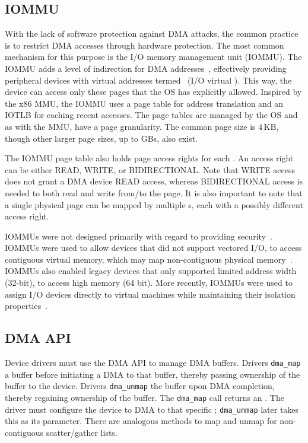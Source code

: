 \subsection{IOMMU}

With the lack of software protection against DMA attacks, the common practice is to restrict DMA accesses through hardware protection. The most common mechanism for this purpose is the I/O memory management unit (IOMMU). The IOMMU adds a level of indirection for DMA addresses~\cite{WRC08,YZ15,SB12,MTF12}, effectively providing peripheral devices with virtual addresses termed~\iova{} (I/O virtual \DIFdelbegin {}\DIFdelend \DIFaddbegin {}\DIFaddend ). This way, the device can access only these pages that the OS has explicitly allowed. Inspired by the x86 MMU, the IOMMU uses a page table for address translation and an IOTLB for caching recent accesses.  The page tables are managed by the OS and as with the MMU, have a page granularity. The common page size is 4\,KB, though other larger page sizes, up to GBs, also exist.

The IOMMU page table also holds page access rights for each \iova. An access right can be either READ, WRITE, or BIDIRECTIONAL. Note that WRITE access does not grant a DMA device READ access, whereas BIDIRECTIONAL access is needed to both read and write from/to the page. It is also important to note that a single physical page can be mapped by multiple \iova{}s, each with a possibly different access right.

IOMMUs were not designed primarily with regard to providing security~\cite{DWT79}. \DIFaddbegin {}\DIFaddend IOMMUs were used to allow devices that did not support vectored I/O, to access contiguous virtual memory, which may map non-contiguous physical memory~\cite{Chu96, WMM97}. IOMMUs also enabled legacy devices that only supported \DIFaddbegin {}\DIFaddend limited address width (32-bit), to access high memory (64 bit). More recently, IOMMUs were used to assign I/O devices directly to virtual machines while maintaining their isolation properties~\cite{Int16b, AMD16}. 
\subsection{DMA API}
Device drivers must use the DMA API to manage DMA buffers. Drivers \texttt{dma\_map} a buffer before initiating a DMA to that buffer, thereby passing ownership of
the buffer to the device. Drivers \texttt{dma\_unmap} the buffer upon
DMA completion, thereby regaining ownership of the buffer.
The \texttt{dma\_map} call returns an \iova. The driver must configure the device to DMA to that specific \iova;
\texttt{dma\_unmap} later takes this \iova as its parameter. There are analogous methods to map and unmap for non-contiguous scatter/gather lists.